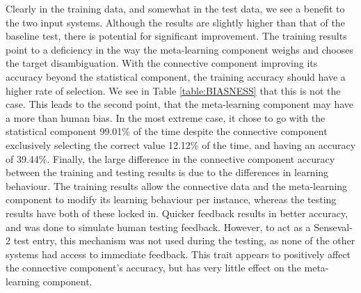 Clearly in the training data, and somewhat in the test data, we see a benefit to
the two input systems. Although the results are slightly higher than that of the
baseline test, there is potential for significant improvement.  The training
results point to a deficiency in the way the meta-learning component weighs and
chooses the target disambiguation.  With the connective component improving its
accuracy beyond the statistical component, the training accuracy should have a
higher rate of selection. We see in Table \ref{table:BIASNESS} that this is not
the case. This leads to the second point, that the meta-learning component may have a
more than human bias.  In the most extreme case, it chose to go with the
statistical component 99.01\% of the time despite the connective component
exclusively selecting the correct value 12.12\% of the time, and having an
accuracy of 39.44\%. Finally, the large difference in the connective component accuracy
between the training and testing results is due to the differences in learning
behaviour.  The training results allow the connective data and the meta-learning
component to modify its learning behaviour per instance, whereas the testing
results have both of these locked in.  Quicker feedback results in better
accuracy, and was done to simulate human testing feedback. However, to act as a Senseval-2 
test entry, this mechanism was not used during the testing, as none of the other systems 
had access to immediate feedback.  This trait appears to positively affect the connective 
component's accuracy, but has very little effect on the meta-learning component.


